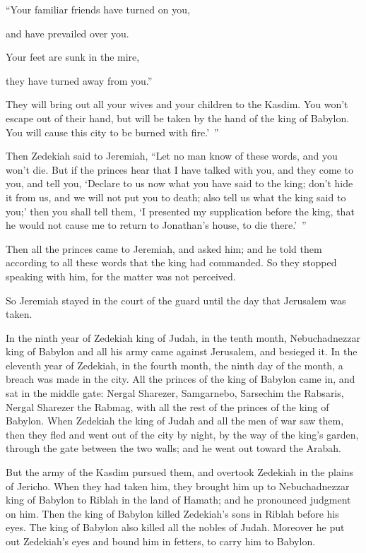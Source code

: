 “Your familiar friends have turned on you,

and have prevailed over you.

Your feet are sunk in the mire,

they have turned away from you.”


\myverse{}They will bring out all your wives and your children to the Kasdim. You won’t escape out of their hand, but will be taken by the hand of the king of Babylon. You will cause this city to be burned with fire.’ ”


\myverse{}Then Zedekiah said to Jeremiah, “Let no man know of these words, and you won’t die. \myverse{}But if the princes hear that I have talked with you, and they come to you, and tell you, ‘Declare to us now what you have said to the king; don’t hide it from us, and we will not put you to death; also tell us what the king said to you;’ \myverse{}then you shall tell them, ‘I presented my supplication before the king, that he would not cause me to return to Jonathan’s house, to die there.’ ”


\myverse{}Then all the princes came to Jeremiah, and asked him; and he told them according to all these words that the king had commanded. So they stopped speaking with him, for the matter was not perceived.


\myverse{}So Jeremiah stayed in the court of the guard until the day that
Jerusalem was taken.


\mychapter{} \myverse*{}In the ninth year of Zedekiah king of Judah, in the tenth month, Nebuchadnezzar king of Babylon and all his army came against Jerusalem, and besieged it. \myverse{}In the eleventh year of Zedekiah, in the fourth month, the ninth day of the month, a breach was made in the city. \myverse{}All the princes of the king of Babylon came in, and sat in the middle gate: Nergal Sharezer, Samgarnebo, Sarsechim the Rabsaris, Nergal Sharezer the Rabmag, with all the rest of the princes of the king of Babylon. \myverse{}When Zedekiah the king of Judah and all the men of war saw them, then they fled and went out of the city by night, by the way of the king’s garden, through the gate between the two walls; and he went out toward the Arabah.


\myverse{}But the army of the Kasdim pursued them, and overtook Zedekiah in the plains of Jericho. When they had taken him, they brought him up to Nebuchadnezzar king of Babylon to Riblah in the land of Hamath; and he pronounced judgment on him. \myverse{}Then the king of Babylon killed Zedekiah’s sons in Riblah before his eyes. The king of Babylon also killed all the nobles of Judah. \myverse{}Moreover he put out Zedekiah’s eyes and bound him in fetters, to carry him to Babylon.


